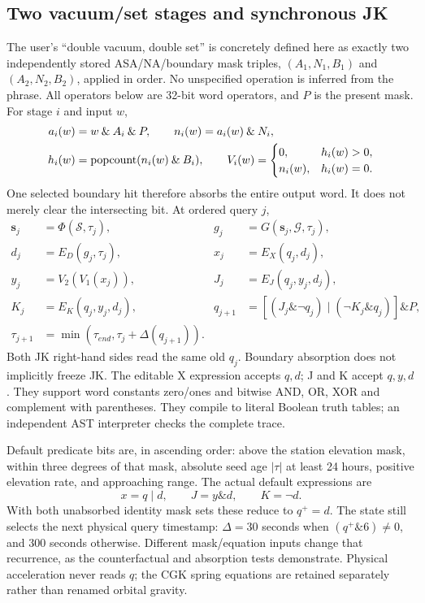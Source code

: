 \subsection{Two vacuum/set stages and synchronous JK}
The user's ``double vacuum, double set'' is concretely defined here as exactly
two independently stored ASA/NA/boundary mask triples,
$(A_1,N_1,B_1)$ and $(A_2,N_2,B_2)$, applied in order. No unspecified operation is
inferred from the phrase. All operators below are 32-bit word operators, and
$P$ is the present mask. For stage $i$ and input $w$,
\begin{align}
a_i(w)&=w\mathbin\& A_i\mathbin\& P,\qquad
n_i(w)=a_i(w)\mathbin\&N_i,\\
h_i(w)&=\operatorname{popcount}(n_i(w)\mathbin\&B_i),\qquad
V_i(w)=\begin{cases}0,&h_i(w)>0,\\n_i(w),&h_i(w)=0.\end{cases}
\end{align}
One selected boundary hit therefore absorbs the entire output word. It does
not merely clear the intersecting bit. At ordered query $j$,
\begin{align}
\mathbf s_j&=\Phi(\mathcal S,\tau_j),&
g_j&=G(\mathbf s_j,\mathcal G,\tau_j),\\
d_j&=E_D(g_j,\tau_j),&x_j&=E_X(q_j,d_j),\\
y_j&=V_2(V_1(x_j)),&J_j&=E_J(q_j,y_j,d_j),\\
K_j&=E_K(q_j,y_j,d_j),&
q_{j+1}&=[(J_j\mathbin\&\neg q_j)\mathbin| (\neg K_j\mathbin\&q_j)]\mathbin\&P,\\
\tau_{j+1}&=\min(\tau_{end},\tau_j+\Delta(q_{j+1})).
\end{align}
Both JK right-hand sides read the same old $q_j$. Boundary absorption does not
implicitly freeze JK. The editable X expression accepts $q,d$; J and K accept
$q,y,d$. They support word constants zero/ones and bitwise AND, OR, XOR and
complement with parentheses. They compile to literal
Boolean truth tables; an independent AST interpreter checks the complete trace.

Default predicate bits are, in ascending order: above the station elevation
mask, within three degrees of that mask, absolute seed age $|\tau|$ at least 24 hours, positive
elevation rate, and approaching range. The actual default expressions are
\begin{equation}
x=q\mathbin|d,\qquad J=y\mathbin\&d,\qquad K=\neg d.
\end{equation}
With both unabsorbed identity mask sets these reduce to $q^+=d$. The state still
selects the next physical query timestamp: $\Delta=30$ seconds when
$(q^+\mathbin\&6)\ne0$, and $300$ seconds otherwise. Different mask/equation
inputs change that recurrence, as the counterfactual and absorption tests
demonstrate. Physical acceleration never reads $q$; the CGK spring equations
are retained separately rather than renamed orbital gravity.

